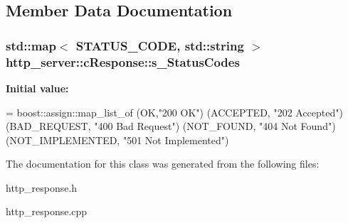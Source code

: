 \subsection{Member Data Documentation}
\hypertarget{classhttp__server_1_1cResponse_a173245993bbac50f72d5a8528526cc26}{
\subsubsection[{s\-\_\-\-Status\-Codes}]{\setlength{\rightskip}{0pt plus 5cm}std\-::map$<$ S\-T\-A\-T\-U\-S\-\_\-\-C\-O\-D\-E, std\-::string $>$ http\-\_\-server\-::c\-Response\-::s\-\_\-\-Status\-Codes\hspace{0.3cm}{\ttfamily [static]}}}\label{classhttp__server_1_1cResponse_a173245993bbac50f72d5a8528526cc26}
{\bfseries Initial value\-:}
\begin{DoxyCode}
= boost::assign::map\_list\_of
        (OK,\textcolor{stringliteral}{"200 OK"})
        (ACCEPTED, \textcolor{stringliteral}{"202 Accepted"})
        (BAD\_REQUEST, \textcolor{stringliteral}{"400 Bad Request"})
        (NOT\_FOUND, \textcolor{stringliteral}{"404 Not Found"})
        (NOT\_IMPLEMENTED, \textcolor{stringliteral}{"501 Not Implemented"})
\end{DoxyCode}


The documentation for this class was generated from the following files\-:\begin{DoxyCompactItemize}
\item 
http\-\_\-response.\-h\item 
http\-\_\-response.\-cpp\end{DoxyCompactItemize}
